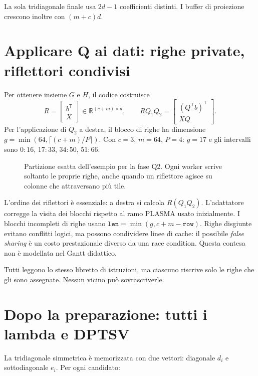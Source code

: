 \documentclass[11pt,a4paper]{article}
\newcommand{\semplice}[1]{\begin{idea}[title=In parole semplici]#1\end{idea}}
\newcommand{\R}{\mathbb{R}}
\newcommand{\T}{\mathsf{T}}
\newcommand{\page}[1]{\clearpage\section{#1}}
\begin{document}
La sola tridiagonale finale usa $2d-1$ coefficienti distinti. I buffer di
proiezione crescono inoltre con $(m+c)d$.
\page{Applicare Q ai dati: righe private, riflettori condivisi}
Per ottenere insieme $G$ e $H$, il codice costruisce
\[
R=\begin{bmatrix}b^{\T}\\X\end{bmatrix}\in\R^{(c+m)\times d},\qquad
RQ_1Q_2=\begin{bmatrix}(Q^{\T}b)^{\T}\\XQ\end{bmatrix}.
\]
Per l'applicazione di $Q_2$ a destra, il blocco di righe ha dimensione
$g=\min(64,\lceil(c+m)/P\rceil)$. Con $c=3$, $m=64$, $P=4$:
$g=17$ e gli intervalli sono $0{:}16$, $17{:}33$, $34{:}50$, $51{:}66$.
\begin{figure}[H]\centering
{}
\caption{Partizione esatta dell'esempio per la fase Q2. Ogni worker scrive soltanto le proprie righe, anche quando un riflettore agisce su colonne che attraversano più tile.}
\end{figure}
L'ordine dei riflettori è essenziale: a destra si calcola $R(Q_1Q_2)$.
L'adattatore corregge la visita dei blocchi rispetto al ramo PLASMA usato
inizialmente. I blocchi incompleti di righe usano
$\texttt{len}=\min(g,c+m-\texttt{row})$.
Righe disgiunte evitano conflitti logici, ma possono condividere linee di
cache: il possibile \emph{false sharing} è un costo prestazionale diverso
da una race condition. Questa contesa non è modellata nel Gantt didattico.
\semplice{Tutti leggono lo stesso libretto di istruzioni, ma ciascuno
riscrive solo le righe che gli sono assegnate. Nessun vicino può sovrascriverle.}
\page{Dopo la preparazione: tutti i lambda e DPTSV}
La tridiagonale simmetrica è memorizzata con due vettori: diagonale $d_i$
e sottodiagonale $e_i$. Per ogni candidato:
\end{document}
